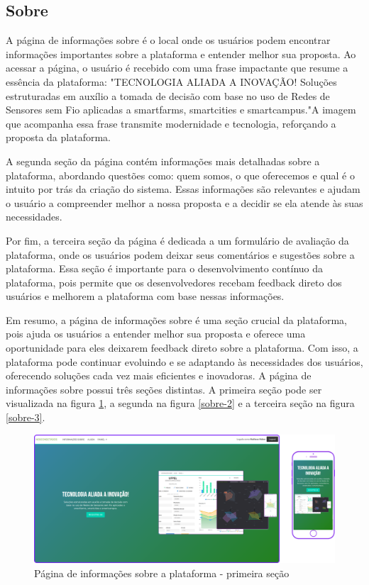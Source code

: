 \documentclass[tcc,capa]{texufpel}
\begin{document}
\subsection{Sobre}
A página de informações sobre é o local onde os usuários podem encontrar informações importantes sobre a plataforma e entender melhor sua proposta. Ao acessar a página, o usuário é recebido com uma frase impactante que resume a essência da plataforma: "TECNOLOGIA ALIADA A INOVAÇÃO! Soluções estruturadas em auxílio a tomada de decisão com base no uso de Redes de Sensores sem Fio aplicadas a smartfarms, smartcities e smartcampus."\space A imagem que acompanha essa frase transmite modernidade e tecnologia, reforçando a proposta da plataforma.

A segunda seção da página contém informações mais detalhadas sobre a plataforma, abordando questões como: quem somos, o que oferecemos e qual é o intuito por trás da criação do sistema. Essas informações são relevantes e ajudam o usuário a compreender melhor a nossa proposta e a decidir se ela atende às suas necessidades.

Por fim, a terceira seção da página é dedicada a um formulário de avaliação da plataforma, onde os usuários podem deixar seus comentários e sugestões sobre a plataforma. Essa seção é importante para o desenvolvimento contínuo da plataforma, pois permite que os desenvolvedores recebam feedback direto dos usuários e melhorem a plataforma com base nessas informações.

Em resumo, a página de informações sobre é uma seção crucial da plataforma, pois ajuda os usuários a entender melhor sua proposta e oferece uma oportunidade para eles deixarem feedback direto sobre a plataforma. Com isso, a plataforma pode continuar evoluindo e se adaptando às necessidades dos usuários, oferecendo soluções cada vez mais eficientes e inovadoras. A página de informações sobre possui três seções distintas. A primeira seção pode ser visualizada na figura \ref{sobre-1}, a segunda na figura \ref{sobre-2} e a terceira seção na figura \ref{sobre-3}.
\begin{figure}[htbp]
  \centering \includegraphics[scale=.2]{assets/sobre1.png}
  \caption{Página de informações sobre a plataforma - primeira seção}
  \label{sobre-1}
\end{figure}
\end{document}
